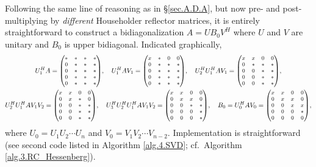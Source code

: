 \noindent Following the same line of reasoning as in \S \ref{sec.A.D.A}, but now pre- and post-multiplying by {\it different} Householder reflector matrices,
it is entirely straightforward to construct a bidiagonalization $A=U B_0 V^H$ where $U$ and $V$ are unitary and $B_0$ is upper bidiagonal.  
Indicated graphically, 
\begin{gather*}
  U^H_1 A = {\footnotesize\begin{pmatrix} * & * & * & * \\ 0 & * & * & * \\ 0 & * & * & * \\ 0 & * & * & * \\ 0 & * & * & * \end{pmatrix}}, \quad
  U^H_1 A V_1 = {\footnotesize\begin{pmatrix} x & * & 0 & 0 \\ 0 & * & * & * \\ 0 & * & * & * \\ 0 & * & * & * \\ 0 & * & * & * \end{pmatrix}}, \quad
  U^H_2 U^H_1 A V_1 = {\footnotesize\begin{pmatrix} x & x & 0 & 0 \\ 0 & * & * & * \\ 0 & 0 & * & * \\ 0 & 0 & * & * \\ 0 & 0 & * & * \end{pmatrix}}, \\
  U^H_2 U^H_1 A V_1 V_2 = {\footnotesize\begin{pmatrix} x & x & 0 & 0 \\ 0 & x & * & 0 \\ 0 & 0 & * & * \\ 0 & 0 & * & * \\ 0 & 0 & * & * \end{pmatrix}}, \quad
  U^H_3 U^H_2 U^H_1 A V_1 V_2 = {\footnotesize\begin{pmatrix} x & x & 0 & 0 \\ 0 & x & x & 0 \\ 0 & 0 & * & * \\ 0 & 0 & 0 & * \\ 0 & 0 & 0 & * \end{pmatrix}}, \quad
  B_0 = U^H_0 A V_0 = {\footnotesize\begin{pmatrix} x & x & 0 & 0 \\ 0 & x & x & 0 \\ 0 & 0 & x & x \\ 0 & 0 & 0 & * \\ 0 & 0 & 0 & 0 \end{pmatrix}},
\end{gather*}
where $U_0=U_1 U_2 \cdots U_n$ and $V_0=V_1 V_2\cdots V_{n-2}$.  Implementation is straightforward (see second code listed in Algorithm \ref{alg.4.SVD}; cf.~Algorithm \ref{alg.3.RC_Hessenberg}).

